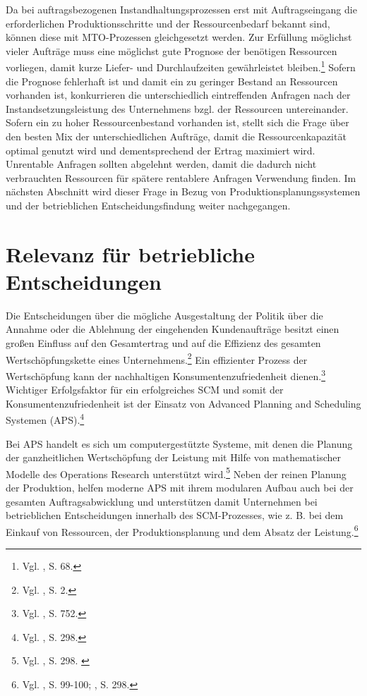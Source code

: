 Da bei auftragsbezogenen Instandhaltungsprozessen erst mit Auftragseingang die erforderlichen Produktionsschritte und der Ressourcenbedarf bekannt sind, können diese mit MTO-Prozessen gleichgesetzt werden. Zur Erfüllung möglichst vieler Aufträge muss eine möglichst gute Prognose der benötigen Ressourcen vorliegen, damit kurze Liefer- und Durchlaufzeiten gewährleistet bleiben.\footnote{Vgl. \cite{thaler2001supply}, S. 68.} Sofern die Prognose fehlerhaft ist und damit ein zu geringer Bestand an Ressourcen vorhanden ist, konkurrieren die unterschiedlich eintreffenden Anfragen nach der Instandsetzungsleistung des Unternehmens bzgl. der Ressourcen untereinander. Sofern ein zu hoher Ressourcenbestand vorhanden ist, stellt sich die Frage über den besten Mix der unterschiedlichen Aufträge, damit die Ressourcenkapazität optimal genutzt wird und dementsprechend der Ertrag maximiert wird. Unrentable Anfragen sollten abgelehnt werden, damit die dadurch nicht verbrauchten Ressourcen für spätere rentablere Anfragen Verwendung finden. Im nächsten Abschnitt wird dieser Frage in Bezug von Produktionsplanungssystemen und der betrieblichen Entscheidungsfindung weiter nachgegangen.


\section{Relevanz für betriebliche Entscheidungen}

Die Entscheidungen über die mögliche Ausgestaltung der Politik über die Annahme oder die Ablehnung der eingehenden Kundenaufträge besitzt einen großen Einfluss auf den Gesamtertrag und auf die Effizienz des gesamten Wertschöpfungskette eines Unternehmens.\footnote{Vgl. \cite{talluri2004theory}, S. 2.} Ein effizienter Prozess der Wertschöpfung kann der nachhaltigen Konsumentenzufriedenheit dienen.\footnote{Vgl. \cite{Heikkila2002747}, S. 752.} Wichtiger Erfolgsfaktor für ein erfolgreiches SCM und somit der Konsumentenzufriedenheit ist der Einsatz von Advanced Planning and Scheduling Systemen (APS).\footnote{Vgl. \cite{fleischmeyr2004codp}, S. 298.}

Bei APS handelt es sich um computergestützte Systeme, mit denen die Planung der ganzheitlichen Wertschöpfung der Leistung mit Hilfe von mathematischer Modelle des Operations Research unterstützt wird.\footnote{Vgl. \cite{fleischmeyr2004codp}, S. 298. \label{fleisch}} Neben der reinen Planung der Produktion, helfen moderne APS mit ihrem modularen Aufbau auch bei der gesamten Auftragsabwicklung und unterstützen damit Unternehmen bei betrieblichen Entscheidungen innerhalb des SCM-Prozesses, wie z. B. bei dem Einkauf von Ressourcen, der Produktionsplanung und dem Absatz der Leistung.\footnote{Vgl. \cite{meyr2015structure}, S. 99-100; \cite{fleischmeyr2004codp}, S. 298.}

